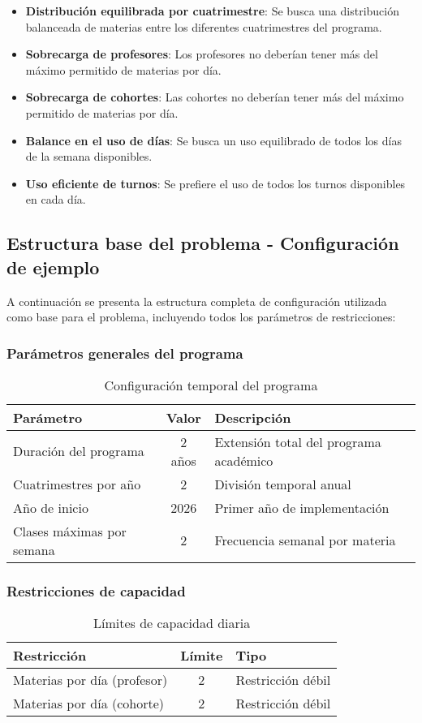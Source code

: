 \begin{itemize}
    \item \textbf{Distribución equilibrada por cuatrimestre}: Se busca una distribución balanceada de materias entre los diferentes cuatrimestres del programa.
    \item \textbf{Sobrecarga de profesores}: Los profesores no deberían tener más del máximo permitido de materias por día.
    \item \textbf{Sobrecarga de cohortes}: Las cohortes no deberían tener más del máximo permitido de materias por día.
    \item \textbf{Balance en el uso de días}: Se busca un uso equilibrado de todos los días de la semana disponibles.
    \item \textbf{Uso eficiente de turnos}: Se prefiere el uso de todos los turnos disponibles en cada día.
\end{itemize}

\subsection{Estructura base del problema - Configuración de ejemplo}
A continuación se presenta la estructura completa de configuración utilizada como base para el problema, incluyendo todos los parámetros de restricciones:

\subsubsection{Parámetros generales del programa}
\begin{table}[ht]
\centering
\begin{tabular}{|l|c|l|}
\hline
\textbf{Parámetro} & \textbf{Valor} & \textbf{Descripción} \\
\hline
Duración del programa & 2 años & Extensión total del programa académico \\
Cuatrimestres por año & 2 & División temporal anual \\
Año de inicio & 2026 & Primer año de implementación \\
Clases máximas por semana & 2 & Frecuencia semanal por materia \\
\hline
\end{tabular}
\caption{Configuración temporal del programa}
\end{table}

\subsubsection{Restricciones de capacidad}
\begin{table}[ht]
\centering
\begin{tabular}{|l|c|l|}
\hline
\textbf{Restricción} & \textbf{Límite} & \textbf{Tipo} \\
\hline
Materias por día (profesor) & 2 & Restricción débil \\
Materias por día (cohorte) & 2 & Restricción débil \\
\hline
\end{tabular}
\caption{Límites de capacidad diaria}
\end{table}

